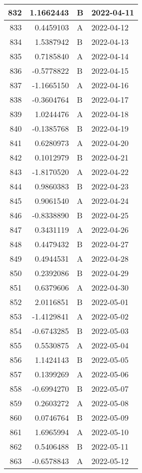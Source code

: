 \begin{tabular}{r|r|l|l}
\hline
832 & 1.1662443 & B & 2022-04-11\\
\hline
833 & 0.4459103 & A & 2022-04-12\\
\hline
834 & 1.5387942 & B & 2022-04-13\\
\hline
835 & 0.7185840 & A & 2022-04-14\\
\hline
836 & -0.5778822 & B & 2022-04-15\\
\hline
837 & -1.1665150 & A & 2022-04-16\\
\hline
838 & -0.3604764 & B & 2022-04-17\\
\hline
839 & 1.0244476 & A & 2022-04-18\\
\hline
840 & -0.1385768 & B & 2022-04-19\\
\hline
841 & 0.6280973 & A & 2022-04-20\\
\hline
842 & 0.1012979 & B & 2022-04-21\\
\hline
843 & -1.8170520 & A & 2022-04-22\\
\hline
844 & 0.9860383 & B & 2022-04-23\\
\hline
845 & 0.9061540 & A & 2022-04-24\\
\hline
846 & -0.8338890 & B & 2022-04-25\\
\hline
847 & 0.3431119 & A & 2022-04-26\\
\hline
848 & 0.4479432 & B & 2022-04-27\\
\hline
849 & 0.4944531 & A & 2022-04-28\\
\hline
850 & 0.2392086 & B & 2022-04-29\\
\hline
851 & 0.6379606 & A & 2022-04-30\\
\hline
852 & 2.0116851 & B & 2022-05-01\\
\hline
853 & -1.4129841 & A & 2022-05-02\\
\hline
854 & -0.6743285 & B & 2022-05-03\\
\hline
855 & 0.5530875 & A & 2022-05-04\\
\hline
856 & 1.1424143 & B & 2022-05-05\\
\hline
857 & 0.1399269 & A & 2022-05-06\\
\hline
858 & -0.6994270 & B & 2022-05-07\\
\hline
859 & 0.2603272 & A & 2022-05-08\\
\hline
860 & 0.0746764 & B & 2022-05-09\\
\hline
861 & 1.6965994 & A & 2022-05-10\\
\hline
862 & 0.5406488 & B & 2022-05-11\\
\hline
863 & -0.6578843 & A & 2022-05-12\\

\end{tabular}
